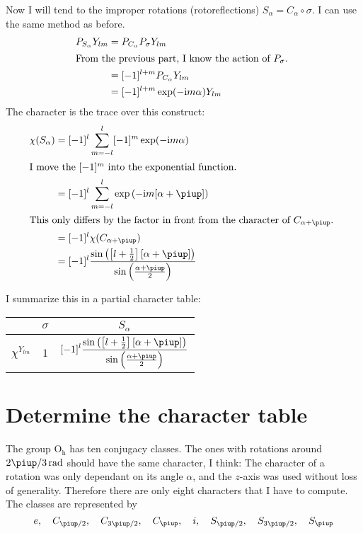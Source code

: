 \documentclass[11pt, english, fleqn, DIV=15, headinclude, BCOR=1cm]{scrartcl}
\begin{document}
Now I will tend to the improper rotations (rotoreflections) $S_\alpha =
C_\alpha \circ \sigma$. I can use the same method as before.
\begin{align*}
    P_{S_\alpha} Y_{lm}
    &= P_{C_\alpha} P_\sigma Y_{lm} \\
    \intertext{%
        From the previous part, I know the action of $P_\sigma$.
    }
    &= [-1]^{l+m} P_{C_\alpha} Y_{lm} \\
    &= [-1]^{l+m} \exp(-\iup m \alpha) Y_{lm}
\end{align*}
The character is the trace over this construct:
\begin{align*}
    \chi(S_\alpha)
    &= [-1]^l \sum_{m=-l}^l [-1]^m \exp(-\iup m \alpha) \\
    \intertext{%
        I move the $[-1]^m$ into the exponential function.
    }
    &= [-1]^l \sum_{m=-l}^l \exp\del{-\iup m [\alpha+\piup]} \\
    \intertext{%
        This only differs by the factor in front from the character of
        $C_{\alpha+\piup}$.
    }
    &= [-1]^l \chi(C_{\alpha+\piup}) \\
    &= [-1]^l \frac{\sin\del{\sbr{l + \frac12}[\alpha +
    \piup]}}{\sin\del{\frac{\alpha+\piup}2}}
\end{align*}

I summarize this in a partial character table:

\begin{tabular}{c|cc}
    & $\sigma$ & $S_\alpha$ \\
    \midrule
    $\chi^{Y_{lm}}$ & $1$ & $\displaystyle
    [-1]^l \frac{\sin\del{\sbr{l + \frac12}[\alpha +
    \piup]}}{\sin\del{\frac{\alpha+\piup}2}}
    $
\end{tabular}

\section{Determine the character table}

The group $\mathrm{O_h}$ has ten conjugacy classes. The ones with rotations
around ${2\piup/3}\,\si{\radian}$ should have the same character, I think: The
character of a rotation was only dependant on its angle $\alpha$, and the
$z$-axis was used without loss of generality. Therefore there are only eight
characters that I have to compute. The classes are represented by
\[
    e
    \eqnsep
    C_{\piup/2}
    \eqnsep
    C_{3\piup/2}
    \eqnsep
    C_{\piup}
    \eqnsep
    i
    \eqnsep
    S_{\piup/2}
    \eqnsep
    S_{3\piup/2}
    \eqnsep
    S_{\piup}
\]
\end{document}
